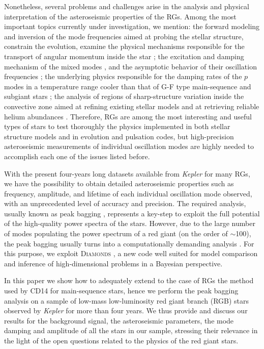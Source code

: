 \documentclass[structabstract]{aa}
\newcommand{\kepler}{\textit{Kepler} }
\newcommand{\diamonds}{\textsc{D\large{iamonds}}}
\begin{document}
Nonetheless, several problems and challenges arise in the analysis and physical interpretation of the asteroseismic properties of the RGs. Among the most important topics currently under investigation, we mention: the forward modeling and inversion of the mode frequencies aimed at probing the stellar structure, constrain the evolution, examine the physical mechanisms responsible for the transport of angular momentum inside the star \citep[e.g.][and references therein]{Tayar13,Benomar14,Deheuvels14}; the excitation and damping mechanism of the mixed modes \citep[e.g.][]{Grosjean14}, and the asymptotic behavior of their oscillation frequencies \citep{Jiang14}; the underlying physics responsible for the damping rates of the $p$ modes in a temperature range cooler than that of G-F type main-sequence and subgiant stars \citep[e.g.][]{Chaplin09,Baudin11temp,Belkacem12,Corsaro12}; the analysis of regions of sharp-structure variation inside the convective zone aimed at refining existing stellar models and at retrieving reliable helium abundances \citep[e.g.][]{Miglio10,Broomhall14,Vrard14,Corsaro15letter}. Therefore, RGs are among the most interesting and useful types of stars to test thoroughly the physics implemented in both stellar structure models and in evolution and pulsation codes, but high-precision asteroseismic measurements of individual oscillation modes are highly needed to accomplish each one of the issues listed before.

With the present four-years long datasets available from \kepler for many RGs, we have the possibility to obtain detailed asteroseismic properties such as frequency, amplitude, and lifetime of each individual oscillation mode observed, with an unprecedented level of accuracy and precision. The required analysis, usually known as peak bagging \citep[e.g.][]{App03PB}, represents a key-step to exploit the full potential of the high-quality power spectra of the stars. However, due to the large number of modes populating the power spectrum of a red giant (on the order of $\sim$100), the peak bagging usually turns into a computationally demanding analysis \citep[e.g. see][]{Benomar09,Gruberbauer09,Kallinger10CoRoT,Handberg11,Corsaro14}. For this purpose, we exploit \diamonds\,\,\citep[][hereafter CD14]{Corsaro14}, a new code well suited for model comparison and inference of high-dimensional problems in a Bayesian perspective.

In this paper we show how to adequately extend to the case of RGs the method used by CD14 for main-sequence stars, hence we perform the peak bagging analysis on a sample of low-mass low-luminosity red giant branch (RGB) stars observed by \kepler for more than four years. We thus provide and discuss our results for the background signal, the asteroseismic parameters, the mode damping and amplitude of all the stars in our sample, stressing their relevance in the light of the open questions related to the physics of the red giant stars.
\end{document}
